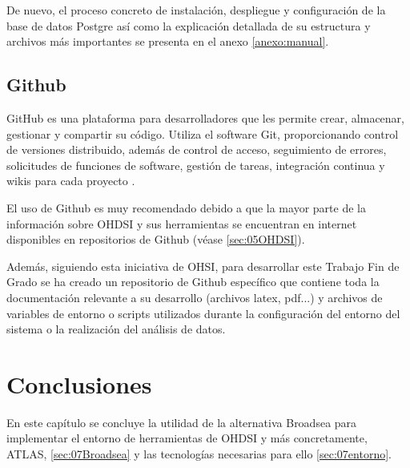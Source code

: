 De nuevo, el proceso concreto de instalación, despliegue y configuración de la base de datos Postgre así como la explicación detallada de su estructura y archivos más importantes se presenta en el anexo \ref{anexo:manual}.

\subsection{Github}

GitHub es una plataforma para desarrolladores que les permite crear, almacenar, gestionar y compartir su código. Utiliza el software Git, proporcionando control de versiones distribuido, además de control de acceso, seguimiento de errores, solicitudes de funciones de software, gestión de tareas, integración continua y wikis para cada proyecto \cite{GithubWikipedia}.

El uso de Github es muy recomendado debido a que la mayor parte de la información sobre OHDSI y sus herramientas se encuentran en internet disponibles en repositorios de Github (véase \ref{sec:05OHDSI}). 

Además, siguiendo esta iniciativa de OHSI, para desarrollar este Trabajo Fin de Grado se ha creado un repositorio de Github específico \cite{vallealonsodc} que contiene toda la documentación relevante a su desarrollo (archivos latex, pdf...) y archivos de variables de entorno o scripts utilizados durante la configuración del entorno del sistema o la realización del análisis de datos.   

\section{Conclusiones}

En este capítulo se concluye la utilidad de la alternativa Broadsea para implementar el entorno de herramientas de OHDSI y más concretamente, ATLAS, \ref{sec:07Broadsea} y las tecnologías necesarias para ello \ref{sec:07entorno}.